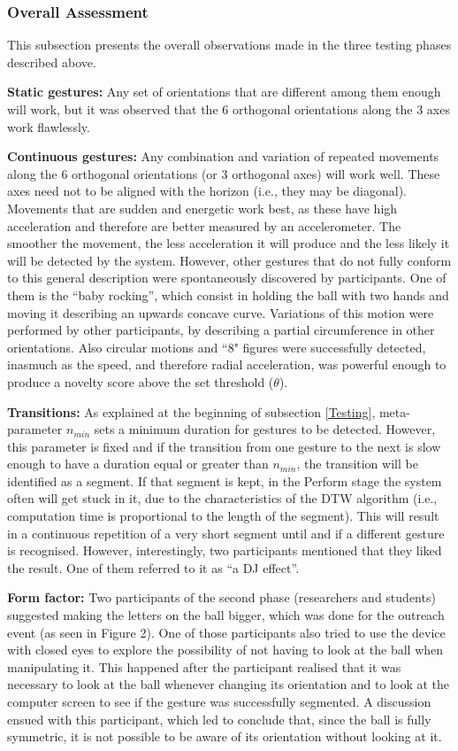 \documentclass{nime-alternate_MANUSCRIPT} %
\begin{document}
\subsubsection{Overall Assessment}

This subsection presents the overall observations made in the three testing phases described above. 

\textbf{Static gestures:} Any set of orientations that are different among them enough will work, but it was observed that the 6 orthogonal orientations along the 3 axes work flawlessly.

\textbf{Continuous gestures:} Any combination and variation of repeated movements along the 6 orthogonal orientations (or 3 orthogonal axes) will work well. These axes need not to be aligned with the horizon (i.e., they may be diagonal).  Movements that are sudden and energetic work best, as these have high acceleration and therefore are better measured by an accelerometer. The smoother the movement, the less acceleration it will produce and the less likely it will be detected by the system. However, other gestures that do not fully conform to this general description were spontaneously discovered by participants. One of them is the “baby rocking”, which consist in holding the ball with two hands and moving it describing an upwards concave curve. Variations of this motion were performed by other participants, by describing a partial circumference in other orientations. Also circular motions and ``8" figures were successfully detected, inasmuch as the speed, and therefore radial acceleration, was powerful enough to produce a novelty score above the set threshold ($\theta $).

\textbf{Transitions:} As explained at the beginning of subsection \ref{Testing}, meta-parameter $n_{min}$ sets a minimum duration for gestures to be detected. However, this parameter is fixed and if the transition from one gesture to the next is slow enough to have a duration equal or greater than $n_{min}$, the transition will be identified as a segment. If that segment is kept, in the Perform stage the system often will get stuck in it, due to the characteristics of the DTW algorithm (i.e., computation time is proportional to the length of the segment). This will result in a continuous repetition of a very short segment until and if a different gesture is recognised. However, interestingly, two participants mentioned that they liked the result. One of them referred to it as “a DJ effect”.

\textbf{Form factor:} Two participants of the second phase (researchers and students) suggested making the letters on the ball bigger, which was done for the outreach event (as seen in Figure 2). One of those participants also tried to use the device with closed eyes to explore the possibility of not having to look at the ball when manipulating it. This happened after the participant realised that it was necessary to look at the ball whenever changing its orientation and to look at the computer screen to see if the gesture was successfully segmented. A discussion ensued with this participant, which led to conclude that, since the ball is fully symmetric, it is not possible to be aware of its orientation without looking at it.
\end{document}

